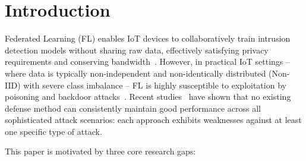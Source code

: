 \documentclass[runningheads]{llncs}
\begin{document}
\section{Introduction}

Federated Learning (FL) enables IoT devices to collaboratively train intrusion detection models without sharing raw data, effectively satisfying privacy requirements and conserving bandwidth~\cite{mcmahan2016communication}. However, in practical IoT settings -- where data is typically non-independent and non-identically distributed (Non-IID) with severe class imbalance -- FL is highly susceptible to exploitation by poisoning and backdoor attacks~\cite{baruch2019little, shejwalkar2021manipulating}. Recent studies~\cite{issa2025dtbfl, zeng2024clipcluster, xu2022signguard} have shown that no existing defense method can consistently maintain good performance across all sophisticated attack scenarios: each approach exhibits weaknesses against at least one specific type of attack.

This paper is motivated by three core research gaps:
\end{document}
